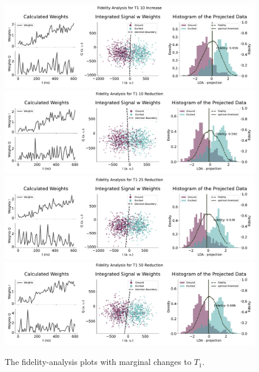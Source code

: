 \begin{figure}[h]
    \centering
    \includegraphics{Simulations/budgets/figures/T1_10_increase_sme.pdf}
    \includegraphics{Simulations/budgets/figures/T1_10_reduction_sme.pdf}
    \includegraphics{Simulations/budgets/figures/T1_25_reduction_sme.pdf}
    \includegraphics{Simulations/budgets/figures/T1_50_reduction_sme.pdf}
    \caption{The fidelity-analysis plots with marginal changes to $T_1$.}
    \label{fig:enter-label}
\end{figure}


